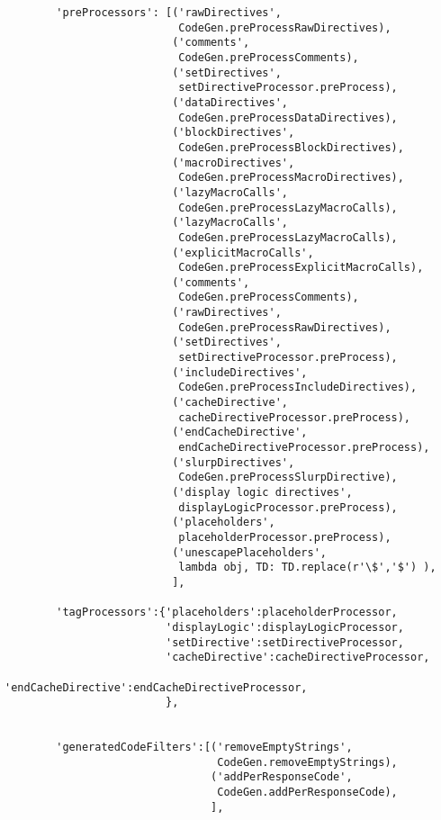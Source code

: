 \begin{verbatim}
        'preProcessors': [('rawDirectives',
                           CodeGen.preProcessRawDirectives),
                          ('comments',
                           CodeGen.preProcessComments),
                          ('setDirectives',
                           setDirectiveProcessor.preProcess),
                          ('dataDirectives',
                           CodeGen.preProcessDataDirectives),
                          ('blockDirectives',
                           CodeGen.preProcessBlockDirectives),
                          ('macroDirectives',
                           CodeGen.preProcessMacroDirectives),
                          ('lazyMacroCalls',
                           CodeGen.preProcessLazyMacroCalls),
                          ('lazyMacroCalls',
                           CodeGen.preProcessLazyMacroCalls),
                          ('explicitMacroCalls',
                           CodeGen.preProcessExplicitMacroCalls),
                          ('comments',
                           CodeGen.preProcessComments),
                          ('rawDirectives',
                           CodeGen.preProcessRawDirectives),
                          ('setDirectives',
                           setDirectiveProcessor.preProcess),
                          ('includeDirectives',
                           CodeGen.preProcessIncludeDirectives),
                          ('cacheDirective',
                           cacheDirectiveProcessor.preProcess),
                          ('endCacheDirective',
                           endCacheDirectiveProcessor.preProcess),
                          ('slurpDirectives',
                           CodeGen.preProcessSlurpDirective),
                          ('display logic directives',
                           displayLogicProcessor.preProcess),
                          ('placeholders',
                           placeholderProcessor.preProcess),
                          ('unescapePlaceholders',
                           lambda obj, TD: TD.replace(r'\$','$') ),
                          ],
                 
        'tagProcessors':{'placeholders':placeholderProcessor,
                         'displayLogic':displayLogicProcessor,
                         'setDirective':setDirectiveProcessor,
                         'cacheDirective':cacheDirectiveProcessor,
                         'endCacheDirective':endCacheDirectiveProcessor,
                         },
            
                    
        'generatedCodeFilters':[('removeEmptyStrings',
                                 CodeGen.removeEmptyStrings),
                                ('addPerResponseCode',
                                 CodeGen.addPerResponseCode),
                                ],
                    

\end{verbatim}
